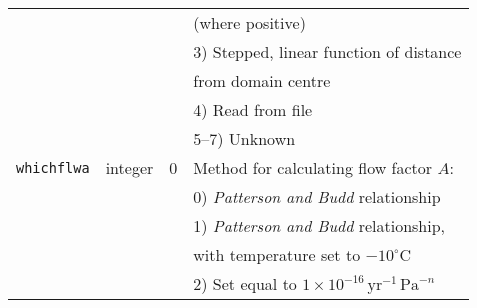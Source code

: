 \begin{center}
\begin{tabular}{|c|c|c|l|}
 & & & (where positive) \\
 & & & 3) Stepped, linear function of distance \\
 & & & from domain centre \\
 & & & 4) Read from file \\
 & & & 5--7) Unknown \\
\hline
\texttt{whichflwa} & integer & 0 & Method for calculating flow factor $A$:\\
 & & & 0) \emph{Patterson and Budd} relationship \\
 & & & 1) \emph{Patterson and Budd} relationship, \\
 & & & with temperature set to $-10^{\circ}\mathrm{C}$ \\
 & & & 2) Set equal to $1\times 10^{-16}\,\mathrm{yr}^{-1}
\,\mathrm{Pa}^{-n}$ \\
\hline
\end{tabular}
\end{center}
%
%
